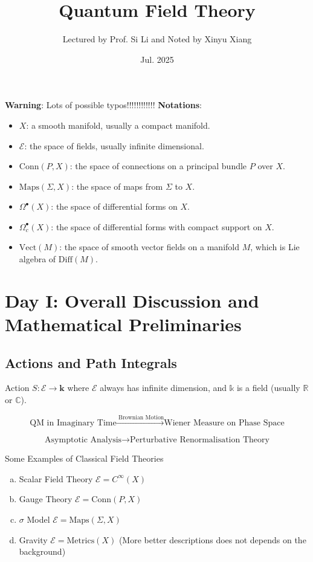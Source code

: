 \documentclass[10pt]{article}
\title{\textbf{Quantum Field Theory}}
\author{Lectured by Prof. Si Li and Noted by Xinyu Xiang}
\date{Jul. 2025}
\begin{document}
\maketitle

\textbf{Warning}: Lots of possible typos!!!!!!!!!!!!
\textbf{Notations}:
\begin{itemize}
  \item $ X$: a smooth manifold, usually a compact manifold.
  \item $ \mathcal{E}$: the space of fields, usually infinite dimensional.
  \item $ \mathrm{Conn}(P,X)$: the space of connections on a principal bundle $ P$ over $ X$.
  \item $ \text{Maps}(\Sigma, X)$: the space of maps from $\Sigma$ to $ X$.
  \item $ \Omega^{\bullet}(X)$: the space of differential forms on $ X$.
  \item $ \Omega^{\bullet}_{c}(X)$: the space of differential forms with compact support on $ X$.
  \item $ \mathrm{Vect}(M)$: the space of smooth vector fields on a manifold $ M$, which is Lie algebra of $ \mathrm{Diff}(M)$.
\end{itemize}

\section{Day I: Overall Discussion and Mathematical Preliminaries}

\subsection{Actions and Path Integrals}

Action $ S: \mathcal{E} \rightarrow \mathbf{k}$ where $ \mathcal{E}$ always has infinite dimension, and $ \mathbb{k}$ is a field (usually $ \mathbb{R}$ or $ \mathbb{C}$).

\begin{equation*}
  \text{QM in Imaginary Time} \xrightarrow{\text{ Brownian Motion}} \text{Wiener Measure on Phase Space}
\end{equation*}

\begin{equation*}
  \text{Asymptotic Analysis} \xrightarrow{\quad} \text{Perturbative Renormalisation Theory}
\end{equation*}

\begin{example} Some Examples of Classical Field Theories
  \begin{enumerate}[(a)]
    \item Scalar Field Theory $ \mathcal{E} = C^{\infty }(X)$
    \item Gauge Theory $ \mathcal{E} = \mathrm{Conn}(P,X)$
    \item $ \sigma$ Model $ \mathcal{E} = \text{Maps}(\Sigma, X)$
    \item Gravity $ \mathcal{E} = \text{Metrics}(X)$ (More better descriptions does not depends on the background)
  \end{enumerate}
\end{example}
\end{document}
